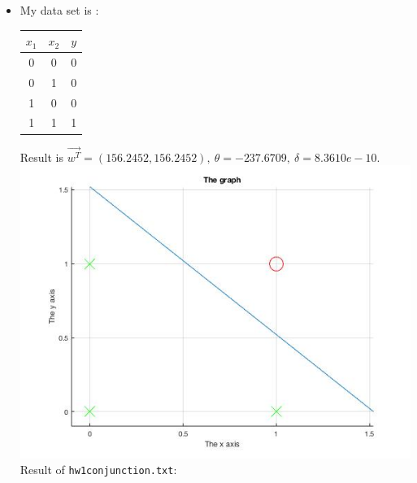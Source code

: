 \begin{enumerate}
\begin{itemize}
\begin{equation*}
\begin{array}{cccccccc}
	y_1x_{11} & y_ix_{12} &  . & . & . & y_ix_{1m}& y_1 & 1 &
	y_2x_{21} & y_2x_{22} &  . & . & . & y_2x_{2m}& y_2 & 1 &
	. & . &  . & . & . & .& . & . &
	. & . &  . & . & . & .& . & . &
	. & . &  . & . & . & .& . & . &
	y_mx_{m1} & y_mx_{m2} &  . & . & . & y_mx_{mm}& y_m & 1 &
	0 & 0 &  . & . & . & 0 & 0 & 1 &
	\end{array} \right),
	\vec{t} = \left(\begin{array}{c} w_1 \cr w_2 \cr . \cr . \cr . \cr w_m\cr \theta \cr \delta \end{array} \right),\ 
	\vec{b} = \left(\begin{array}{c} 1 \cr 1 \cr . \cr . \cr .\cr 1 \cr 1\cr 0 \end{array} \right)
\end{equation*}
\clearpage
\item[(b.2)]
	My data set is :

\begin{center}
  \begin{tabular}{ | c | c | c | }
    \hline
    $x_1$ & $x_2$ & $y$ \\ \hline
    0 & 0 & 0 \\ \hline
    0 & 1 & 0 \\ \hline
    1 & 0 & 0 \\ \hline
    1 & 1 & 1 \\ \hline
  \end{tabular}
\end{center}
	Result is $\vec{w^T} = (156.2452, 156.2452),\ \theta = -237.6709,\ \delta =8.3610e-10$.\\
	\includegraphics[scale= 0.8]{fig1.jpg}\\
	Result of {\tt hw1conjunction.txt}:


\end{itemize}
\end{enumerate}
